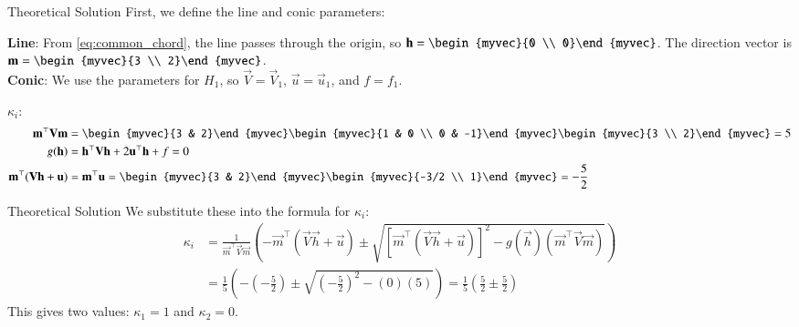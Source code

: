 \documentclass{beamer}
\begin{document}
		\begin{frame}{Theoretical Solution}
		First, we define the line and conic parameters:
		
		\textbf{Line}: From \eqref{eq:common_chord}, the line passes through the origin, so $\vec{h} = \begin{myvec}{0 \\ 0}\end{myvec}$. The direction vector is $\vec{m} = \begin{myvec}{3 \\ 2}\end{myvec}$.\\
		\textbf{Conic}: We use the parameters for $H_1$, so $\vec{V} = \vec{V}_1$, $\vec{u} = \vec{u}_1$, and $f = f_1$.
		
		
		$\kappa_i$:
		\begin{align}
			\vec{m}^\top\vec{V}\vec{m} &= \begin{myvec}{3 & 2}\end{myvec}\begin{myvec}{1 & 0 \\ 0 & -1}\end{myvec}\begin{myvec}{3 \\ 2}\end{myvec} = 5 \\
			g(\vec{h}) &= \vec{h}^\top\vec{V}\vec{h} + 2\vec{u}^\top\vec{h} + f = 0 \\
			\vec{m}^\top(\vec{V}\vec{h} + \vec{u}) &= \vec{m}^\top\vec{u} = \begin{myvec}{3 & 2}\end{myvec}\begin{myvec}{-3/2 \\ 1}\end{myvec} = -\frac{5}{2}
		\end{align}
		
	\end{frame}	
	\begin{frame}{Theoretical Solution}
		We substitute these into the formula for $\kappa_i$:
	\begin{align}
		\kappa_i &= \frac{1}{\vec{m}^\top\vec{V}\vec{m}} \left( - \vec{m}^\top(\vec{V}\vec{h} + \vec{u}) \pm \sqrt{[\vec{m}^\top(\vec{V}\vec{h} + \vec{u})]^2 - g(\vec{h})(\vec{m}^\top\vec{V}\vec{m})} \right) \nonumber \\
		&= \frac{1}{5} \left( -(-\frac{5}{2}) \pm \sqrt{(-\frac{5}{2})^2 - (0)(5)} \right) = \frac{1}{5} \left( \frac{5}{2} \pm \frac{5}{2} \right)
	\end{align}
	This gives two values: $\kappa_1 = 1$ and $\kappa_2 = 0$.
	
	\end{frame}
\end{document}
